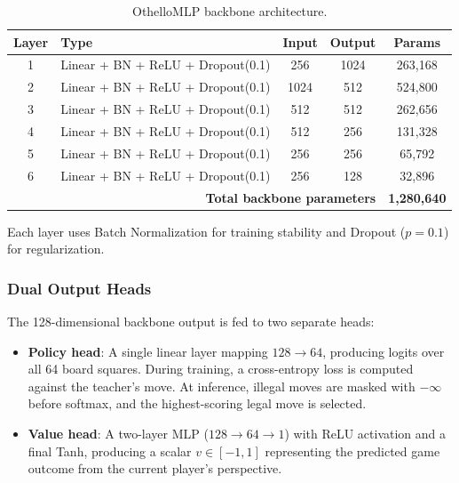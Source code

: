\begin{table}[H]
    \centering
    \caption{OthelloMLP backbone architecture.}
    \label{tab:arch}
    \begin{tabular}{clccc}
        \toprule
        \textbf{Layer} & \textbf{Type} & \textbf{Input} & \textbf{Output} & \textbf{Params} \\
        \midrule
        1 & Linear + BN + ReLU + Dropout(0.1) & 256  & 1024 & 263{,}168 \\
        2 & Linear + BN + ReLU + Dropout(0.1) & 1024 & 512  & 524{,}800 \\
        3 & Linear + BN + ReLU + Dropout(0.1) & 512  & 512  & 262{,}656 \\
        4 & Linear + BN + ReLU + Dropout(0.1) & 512  & 256  & 131{,}328 \\
        5 & Linear + BN + ReLU + Dropout(0.1) & 256  & 256  & 65{,}792  \\
        6 & Linear + BN + ReLU + Dropout(0.1) & 256  & 128  & 32{,}896  \\
        \midrule
        \multicolumn{4}{r}{\textbf{Total backbone parameters}} & \textbf{1{,}280{,}640} \\
        \bottomrule
    \end{tabular}
\end{table}

Each layer uses Batch Normalization for training stability and Dropout ($p=0.1$) for regularization.

\subsubsection{Dual Output Heads}

The 128-dimensional backbone output is fed to two separate heads:

\begin{itemize}
    \item \textbf{Policy head}: A single linear layer mapping $128 \rightarrow 64$, producing logits over all 64 board squares. During training, a cross-entropy loss is computed against the teacher's move. At inference, illegal moves are masked with $-\infty$ before softmax, and the highest-scoring legal move is selected.
    \item \textbf{Value head}: A two-layer MLP ($128 \rightarrow 64 \rightarrow 1$) with ReLU activation and a final Tanh, producing a scalar $v \in [-1, 1]$ representing the predicted game outcome from the current player's perspective.
\end{itemize}

